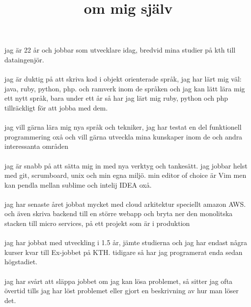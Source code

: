 \documentclass{article}
\title{om mig sj{\"a}lv}%
\begin{document}
\maketitle
jag är 22 år och jobbar som utvecklare idag, bredvid mina studier på kth till dataingenjör.
\\\\
jag är duktig på att skriva kod i objekt orienterade språk, jag har lärt mig väl: java, ruby, python, php. och ramverk inom de språken och jag kan lätt lära mig ett nytt språk, bara under ett år så har jag lärt mig ruby, python och php tillräckligt för att jobba med dem.
\\\\
jag vill gärna lära mig nya språk och tekniker, jag har testat en del funktionell programmering oxå och vill gärna utveckla mina kunskaper inom de och andra interessanta områden
\\\\
jag är snabb på att sätta mig in med nya verktyg och tankesätt. jag jobbar helst med git, scrumboard, unix och min egna miljö. min editor of choice är Vim men kan pendla mellan sublime och intelij IDEA oxå.
\\\\
jag har senaste året jobbat mycket med cloud arkitektur speciellt amazon AWS.
och även skriva backend till en större webapp och bryta ner den monolitska stacken till micro services, på ett projekt som är i produktion
\\\\ 
jag har jobbat med utveckling i 1.5 år, jämte studierna och jag har endast några kurser kvar till Ex-jobbet på KTH. tidigare så har jag programerat enda sedan högstadiet.
\\\\
jag har svårt att släppa jobbet om jag kan lösa problemet, så sitter jag ofta övertid tills jag har löst problemet eller gjort en beskrivning av hur man löser det.
\end{document}
